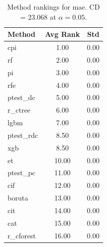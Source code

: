 \begin{table}[h]
\centering
\caption{Method rankings for mae. CD = 23.068 at $\alpha=0.05$.}
\label{tab:ranks_mae}
\begin{tabular}{lcc}
\toprule
Method & Avg Rank & Std \\
\midrule
cpi & 1.00 & 0.00 \\
rf & 2.00 & 0.00 \\
pi & 3.00 & 0.00 \\
rfe & 4.00 & 0.00 \\
ptest_dc & 5.00 & 0.00 \\
r_ctree & 6.00 & 0.00 \\
lgbm & 7.00 & 0.00 \\
ptest_rdc & 8.50 & 0.00 \\
xgb & 8.50 & 0.00 \\
et & 10.00 & 0.00 \\
ptest_pc & 11.00 & 0.00 \\
cif & 12.00 & 0.00 \\
boruta & 13.00 & 0.00 \\
cit & 14.00 & 0.00 \\
cat & 15.00 & 0.00 \\
r_cforest & 16.00 & 0.00 \\
\bottomrule
\end{tabular}
\end{table}